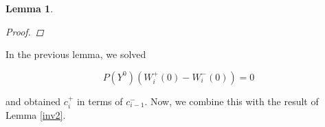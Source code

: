 \documentclass[12pt]{article}
\newtheorem{lemma}{Lemma}
\begin{document}
\begin{lemma}
\begin{proof}

\end{proof}
\end{lemma}


In the previous lemma, we solved

\[
P(Y^0) ( W_i^+(0) - W_i^-(0) ) = 0
\]

and obtained $c_i^+$ in terms of $c_{i-1}^-$. Now, we combine this with the result of Lemma \ref{inv2}.
\end{document}
